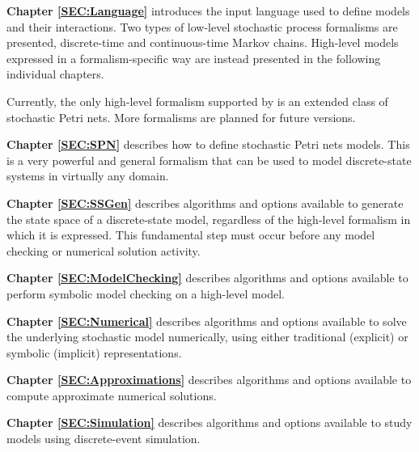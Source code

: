 \begin{description}

\item{\bf Chapter \ref{SEC:Language}}
introduces the {\smart} input language used to define models and their
interactions.
Two types of low-level stochastic process formalisms
are presented, discrete-time and continuous-time
Markov chains. High-level models expressed in
a formalism-specific way are instead presented in the following
individual chapters.

\begin{release}
Currently, the only high-level formalism supported by {\smart}
is an extended class of stochastic Petri nets.
More formalisms are planned for future versions.
\end{release}

\item{\bf Chapter \ref{SEC:SPN}}
describes how to define stochastic Petri nets models.
This is a very powerful and general formalism that can be used to model
discrete-state systems in virtually any domain.

\item{\bf Chapter \ref{SEC:SSGen}}
describes algorithms and options available to generate the state space
of a discrete-state model, regardless of the high-level formalism in which
it is expressed.
This fundamental step must occur before any model checking or
numerical solution activity.

\item{\bf Chapter \ref{SEC:ModelChecking}}
describes algorithms and options available to perform symbolic
model checking on a high-level model.

\item{\bf Chapter \ref{SEC:Numerical}}
describes algorithms and options available to solve the underlying
stochastic model numerically, using either traditional (explicit) or
symbolic (implicit) representations.

\begin{developer}
\item{\bf Chapter \ref{SEC:Approximations}}
describes algorithms and options available to compute approximate
numerical solutions.
\end{developer}

\begin{developer}
\item{\bf Chapter \ref{SEC:Simulation}}
describes algorithms and options available to study models
using discrete-event simulation.
\end{developer}


\end{description}
